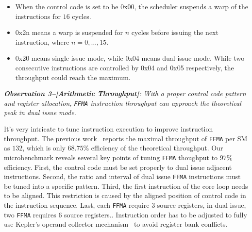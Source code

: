 \begin{itemize}
\item When the control code is set to be 0x00, the scheduler suspends a warp of the instructions for $16$ cycles.
\item 0x2n means a warp is suspended for $n$ cycles before issuing the next instruction, where $n=0, \dots, 15$.
\item 0x20 means single issue mode, while 0x04 means dual-issue mode.
While two consecutive instructions are controlled by 0x04 and 0x05 respectively, the throughput could reach the maximum.
\end{itemize}

{\em {\bf Observation 3--[Arithmetic Throughput]}:
With a proper control code pattern and register allocation, {\tt FFMA}
instruction throughput can approach the theoretical peak in dual issue mode.}

It's very intricate to tune instruction execution to improve instruction throughput. The previous work~\cite{lai}
reports the maximal throughput of {\tt FFMA} per SM as $132$, which is only $68.75\%$ efficiency of the theoretical
throughput. Our microbenchmark reveals several key points of tuning {\tt FFMA} thoughput to $97\%$ efficiency.
First, the control code must be set properly to dual issue adjacent instructions. 
Second, the ratio and interval of dual issue {\tt FFMA} instructions must be tuned into a specific pattern.
Third, the first instruction of the core loop needs to be aligned. This restriction is
caused by the aligned position of control code in the instruction sequence.
Last, each {\tt FFMA} require $3$ source registers, in dual issue, two {\tt FFMA} requires $6$ source registers..
Instruction order has to be adjusted to fully use Kepler's operand collector mechanism~\cite{collector,tarjan2012policy}
to avoid register bank conflicts.

